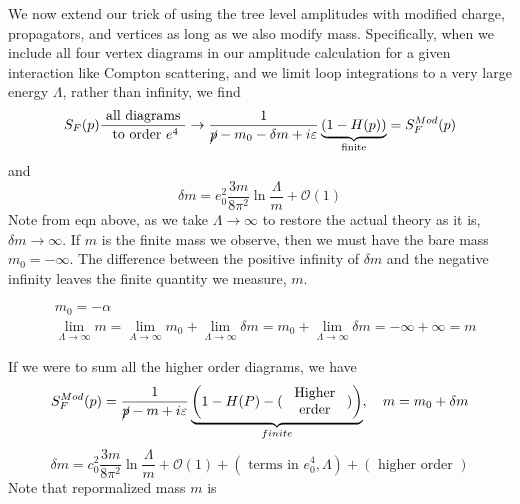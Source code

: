 We now extend our trick of using the tree level amplitudes with modified charge, propagators, and vertices as long as we also modify mass. Specifically, when we include all four vertex diagrams in our amplitude calculation for a given interaction like Compton scattering, and we limit loop integrations to a very large energy $\Lambda$, rather than infinity, we find 
\begin{equation}
S_{F}(p) \frac{\text { all diagrams }}{\text { to order } e^{4}}\to \frac{1}{\cancel{p}-m_{0}-\delta m+i \varepsilon} \underbrace{(1-H(p))}_{\text { finite }}=S_{F}^{Mod}(p)
\end{equation}
and
\begin{equation}\label{mass-counterterm}
    \delta m=e_{0}^{2} \frac{3 m}{8 \pi^{2}} \ln \frac{\Lambda}{m}+\mathcal{O}(1)
\end{equation}
Note from eqn above, as we take $\Lambda\to\infty$ to restore the actual theory as it is, $\delta m\to\infty$. If $m$ is the finite mass we observe, then we must have the bare mass $m_0=-\infty$. The difference between the positive infinity of $\delta m$ and the negative infinity leaves the finite quantity we measure, $m$.
\begin{qt}
    \begin{equation}\begin{aligned}
&m_{0}=-\alpha\\
&\lim_{\Lambda\to\infty} m=\lim_{A \rightarrow \infty} m_{0}+\lim_{\Lambda \rightarrow \infty} \delta m=m_{0}+\lim_{\Lambda \rightarrow \infty} \delta m=-\infty+\infty=m
\end{aligned}\end{equation}
\end{qt}
If we were to sum all the higher order diagrams, we have
\begin{equation}S_{F}^{M o d}(p)=\frac{1}{\cancel{p}-m+i\varepsilon}\underbrace{\left(1-H(P)-(\begin{array}{c}
\text { Higher } \\
\text { erder }
\end{array})\right)}_{finite}, \quad m=m_{0}+\delta m\end{equation}
\begin{equation}\delta m=c_{0}^{2} \frac{3 m}{8 \pi^{2}} \ln \frac{\Lambda}{m}+\mathcal{O}(1)+\left(\text { terms in } e_{0}^{4}, \Lambda\right)+(\text { higher order })\end{equation}
Note that repormalized mass $m$ is 

